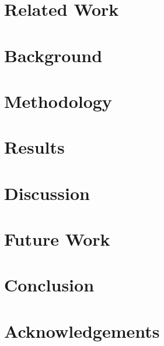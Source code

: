 \documentclass[9pt,twocolumn]{article}
\begin{document}
\section{Related Work}



\section{Background}



\section{Methodology}



\section{Results}



\section{Discussion}



% 


\section{Future Work}



\section{Conclusion}


\section*{Acknowledgements}


\printbibliography
\end{document}
